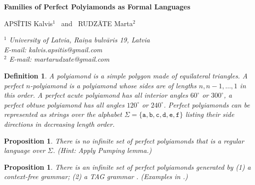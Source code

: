 \documentclass[a4paper,12pt]{article}
\newtheorem{proposition} [theorem] {\bf Proposition}
\newtheorem{definition} [theorem] {\bf Definition}
\begin{document}
\begin{center}
	 {\bf \large Families of Perfect Polyiamonds as Formal Languages}
\end{center}

\vspace{0.1cm}

\begin{center}\large {
APSĪTIS Kalvis$^1$
\  and  \
RUDZĀTE Marta$^2$}
\end{center}
\begin{center}
\it {
$^1$ University of Latvia, 
Raiņa bulvāris 19, 
Latvia \\
E-mail: {\rm kalvis.apsitis@gmail.com} \\
\vspace{1mm}
$^2$ %
E-mail: {\rm martarudzate@gmail.com }}
\end{center}
\vspace{0.2cm}

\noindent
\begin{definition}
A {\em polyiamond} is a simple polygon made of equilateral triangles. A {\em perfect $n$-polyiamond}\cite{APSITIS1} is a polyiamond whose sides are of lengths $n,n-1,\ldots,1$ in this order. 
A {\em perfect acute polyiamond} has all interior angles $60^{\circ}$ or $300^{\circ}$, a {\em perfect obtuse polyiamond} has all angles $120^{\circ}$ or $240^{\circ}$.
Perfect polyiamonds can be represented as strings over the alphabet 
$\Sigma = \{ \mathtt{a}, \mathtt{b}, \mathtt{c}, \mathtt{d}, \mathtt{e}, \mathtt{f} \}$ listing their side directions in decreasing length order. 
\end{definition}



\begin{proposition}
There is no infinite set of perfect polyiamonds that is a regular language over $\Sigma$. ({\em Hint:} Apply Pumping lemma.)
\end{proposition}



\begin{proposition}
There is an infinite set of perfect polyiamonds generated by (1) a context-free grammar; (2) a TAG grammar \cite{Joshi1997}. (Examples in \cite{RudzateApsitis2024}.)
\end{proposition}
\end{document}
